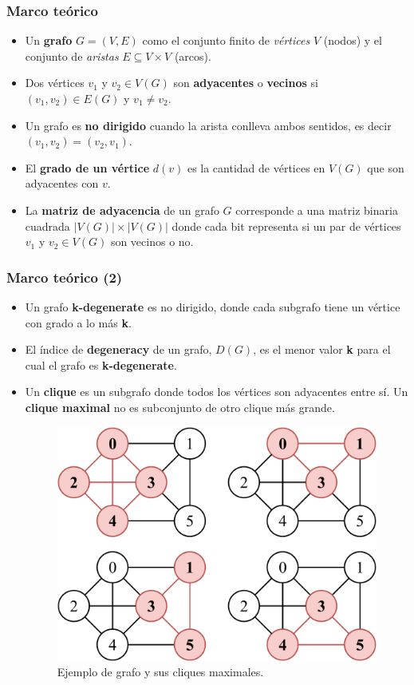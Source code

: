 \begin{frame}
\frametitle{Marco teórico}

\begin{itemize}
	\item Un \textbf{grafo} $G = (V, E)$ como el conjunto finito de \textit{vértices} $V$ (nodos) y el conjunto de \textit{aristas} $E \subseteq V \times V$ (arcos).
	\item Dos vértices $v_{1}$ y $v_{2} \in V(G)$ son \textbf{adyacentes} o \textbf{vecinos} si $(v_{1}, v_{2}) \in E(G)$ y $v_{1} \neq v_{2}$.
	\item Un grafo es \textbf{no dirigido} cuando la arista conlleva ambos sentidos, es decir $(v_{1}, v_{2}) = (v_{2}, v_{1})$.
	\item El \textbf{grado de un vértice} $d(v)$ es la cantidad de vértices en $V(G)$ que son adyacentes con $v$.
	\item La \textbf{matriz de adyacencia} de un grafo $G$ corresponde a una matriz binaria cuadrada $|V(G)| \times |V(G)|$ donde cada bit representa si un par de vértices $v_{1}$ y $v_{2} \in V(G)$ son vecinos o no.
\end{itemize}

\end{frame}



\begin{frame}
\frametitle{Marco teórico (2)}

\begin{itemize}
	\item Un grafo \textbf{k-degenerate} es no dirigido, donde cada subgrafo tiene un vértice con grado a lo más \textbf{k}. 
	\item El índice de \textbf{degeneracy} de un grafo, $D(G)$, es el menor valor \textbf{k} para el cual el grafo es \textbf{k-degenerate}.
	\item Un \textbf{clique} es un subgrafo donde todos los vértices son adyacentes entre sí. Un \textbf{clique maximal} no es subconjunto de otro clique más grande.
	\begin{figure}
    	\centering
    	\includegraphics[width=0.4\linewidth]{../img/maxCliqueExample.pdf}
    	
    \caption{Ejemplo de grafo y sus cliques maximales.}
    \label{fig:maxCliqueExample}
\end{figure}
\end{itemize}

\end{frame}


